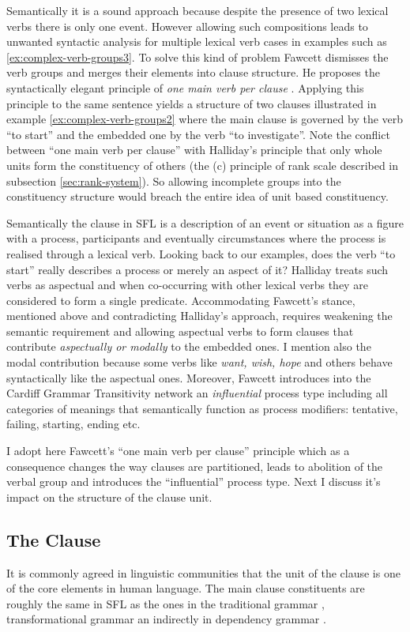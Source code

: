 Semantically it is a sound approach because despite the presence of two lexical verbs there is only one event. However allowing such compositions leads to unwanted syntactic analysis for multiple lexical verb cases in examples such as \ref{ex:complex-verb-groups3}. To solve this kind of problem Fawcett dismisses the verb groups and merges their elements into clause structure. He proposes the syntactically elegant principle of \textit{one main verb per clause} \citep{Fawcett2008}. Applying this principle to the same sentence yields a structure of two clauses illustrated in example \ref{ex:complex-verb-groups2} where the main clause is governed by the verb ``to start'' and the embedded one by the verb ``to investigate''. Note the conflict between ``one main verb per clause'' with Halliday's principle that only whole units form the constituency of others (the (c) principle of rank scale described in subsection \ref{sec:rank-system}). So allowing incomplete groups into the constituency structure would breach the entire idea of unit based constituency. 

Semantically the clause in SFL is a description of an event or situation as a figure with a process, participants and eventually circumstances where the process is realised through a lexical verb. Looking back to our examples, does the verb ``to start'' really describes a process or merely an aspect of it? Halliday treats such verbs as aspectual and when co-occurring with other lexical verbs they are considered to form a single predicate. Accommodating Fawcett's stance, mentioned above and contradicting Halliday's approach, requires weakening the semantic requirement and allowing aspectual verbs to form clauses that contribute \textit{aspectually or modally} to the embedded ones. I mention also the modal contribution because some verbs like \textit{want, wish, hope} and others behave syntactically like the aspectual ones. Moreover, Fawcett introduces into the Cardiff Grammar Transitivity network an \textit{influential} process type including all categories of meanings that semantically function as process modifiers: tentative, failing, starting, ending etc.

I adopt here Fawcett's ``one main verb per clause'' principle which as a consequence changes the way clauses are partitioned, leads to abolition of the verbal group and introduces the ``influential'' process type. Next I discuss it's impact on the structure of the clause unit. 

\subsection{The Clause}
\label{sec:cardiff-clause}
It is commonly agreed in linguistic communities that the unit of the clause is one of the core elements in human language. 
The main clause constituents are roughly the same in SFL as the ones in the traditional grammar \citep{Quirk1985}, transformational grammar \citep{Chomsky1957} an indirectly in dependency grammar \citep{Hudson2010}.

